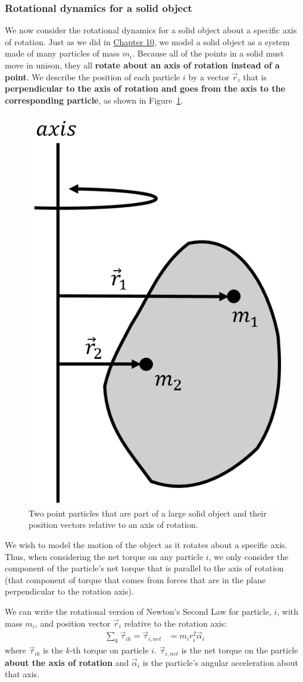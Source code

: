 \subsubsection{Rotational dynamics for a solid object}

We now consider the rotational dynamics for a solid object about a specific axis of rotation. Just as we did in \href{\#momentumandcm}{Chapter 10}, we model a solid object as a system made of many particles of mass $m_i$. Because all of the points in a solid must move in unison, they all \textbf{rotate about an axis of rotation instead of a point}. We describe the position of each particle $i$ by a vector $\vec r_i$ that is \textbf{perpendicular to the axis of rotation and goes from the axis to the corresponding particle}, as shown in Figure~\ref{fig:rotationaldynamics:blob}.

\begin{figure}[!htbp]
\centering
\includegraphics[width=0.375\linewidth]{files/blob-3a7672cec9d414b59409dc409c60ede3.png}
\caption[]{Two point particles that are part of a large solid object and their position vectors relative to an axis of rotation.}
\label{fig:rotationaldynamics:blob}
\end{figure}

We wish to model the motion of the object as it rotates about a specific axis. Thus, when considering the net torque on any particle $i$, we only consider the component of the particle's net torque that is parallel to the axis of rotation (that component of torque that comes from forces that are in the plane perpendicular to the rotation axis).

We can write the rotational version of Newton's Second Law for particle, $i$, with mass $m_i$, and position vector $\vec r_i$ relative to the rotation axis:
\begin{align*}
\sum_k \vec\tau_{ik} = \vec\tau_{i,net} &= m_ir_i^2\vec\alpha_i
\end{align*}
where $\vec\tau_{ik}$ is the $k$-th torque on particle $i$. $\vec\tau_{i,net}$ is the net torque on the particle \textbf{about the axis of rotation} and $\vec\alpha_i$ is the particle's angular acceleration about that axis.

